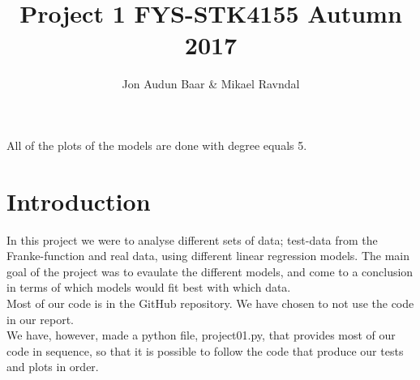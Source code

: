\documentclass[a4paper,norsk]{article}
\title {Project 1 FYS-STK4155 Autumn 2017}
\author {Jon Audun Baar \& Mikael Ravndal}
\begin{document}
\maketitle
All of the plots of the models are done with degree equals 5.
\section*{Introduction}
In this project we were to analyse different sets of data; test-data from the Franke-function and real data, using different linear regression models. The main goal of the project was to evaulate the different models, and come to a conclusion in terms of which models would fit best with which data.
\\Most of our code is in the GitHub repository. We have chosen to not use the code in our report.
\\We have, however, made a python file, project01.py, that provides most of our code in sequence, so that it is possible to follow the code that produce our tests and plots in order.
\end{document}
